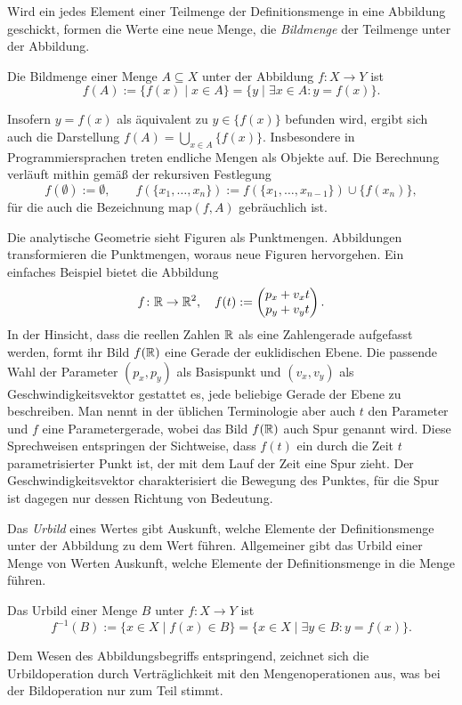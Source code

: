 Wird ein jedes Element einer Teilmenge der Definitionsmenge in eine
Abbildung geschickt, formen die Werte eine neue Menge, die
\emph{Bildmenge} der Teilmenge unter der Abbildung.

\begin{Definition}[Bild]\label{def:Bild}\newlinefirst
Die Bildmenge einer Menge $A\subseteq X$ unter der Abbildung
$f\colon X\to Y$ ist
\[f(A) := \{f(x)\mid x\in A\} = \{y\mid\exists x\in A\colon y=f(x)\}.\]
\end{Definition}
Insofern $y=f(x)$ als äquivalent zu $y\in\{f(x)\}$ befunden wird, ergibt
sich auch die Darstellung $f(A) = \bigcup_{x\in A} \{f(x)\}$.
Insbesondere in Programmiersprachen treten endliche Mengen als Objekte
auf. Die Berechnung verläuft mithin gemäß der rekursiven Festlegung%
\[f(\emptyset) := \emptyset,\qquad f(\{x_1,\ldots,x_n\}) :=
f(\{x_1,\ldots,x_{n-1}\})\cup \{f(x_n)\},\]
für die auch die Bezeichnung $\mathrm{map}(f,A)$ gebräuchlich ist.

Die analytische Geometrie sieht Figuren als Punktmengen. Abbildungen
transformieren die Punktmengen, woraus neue Figuren hervorgehen.
Ein einfaches Beispiel bietet die Abbildung%
\[f\colon\mathbb R\to\mathbb R^2,\quad f(t) :=
\begin{pmatrix}p_x + v_x t\\ p_y + v_y t\end{pmatrix}.\]
In der Hinsicht, dass die reellen Zahlen $\mathbb R$ als eine Zahlengerade
aufgefasst werden, formt ihr Bild $f(\mathbb R)$ eine Gerade der euklidischen
Ebene. Die passende Wahl der Parameter $(p_x,p_y)$ als Basispunkt
und $(v_x,v_y)$ als Geschwindigkeitsvektor gestattet es, jede
beliebige Gerade der Ebene zu beschreiben. Man nennt in der üblichen
Terminologie aber auch $t$ den Parameter und $f$ eine Parametergerade,
wobei das Bild $f(\mathbb R)$ auch Spur genannt wird. Diese Sprechweisen
entspringen der Sichtweise, dass $f(t)$ ein durch die Zeit $t$
parametrisierter Punkt ist, der mit dem Lauf der Zeit eine Spur zieht.
Der Geschwindigkeitsvektor charakterisiert die Bewegung des Punktes,
für die Spur ist dagegen nur dessen Richtung von Bedeutung.

Das \emph{Urbild} eines Wertes gibt Auskunft, welche
Elemente der Definitionsmenge unter der Abbildung zu dem Wert führen.
Allgemeiner gibt das Urbild einer Menge von Werten Auskunft, welche
Elemente der Definitionsmenge in die Menge führen.

\begin{Definition}[Urbild]\newlinefirst
Das Urbild einer Menge $B$ unter $f\colon X\to Y$ ist
\[f^{-1}(B) := \{x\in X\mid f(x)\in B\} = \{x\in X\mid \exists y\in B\colon y=f(x)\}.\]
\end{Definition}
Dem Wesen des Abbildungsbegriffs entspringend, zeichnet sich die
Urbildoperation durch Verträglichkeit mit den Mengenoperationen aus,
was bei der Bildoperation nur zum Teil stimmt.

